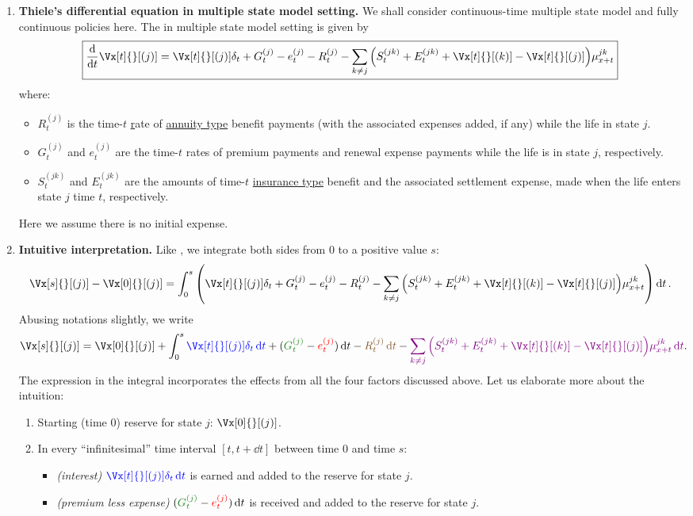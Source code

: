 \begin{enumerate}
\item\label{it:thiele-diff-eq-mult-state} \textbf{Thiele's differential
equation in multiple state model setting.} We shall consider continuous-time
multiple state model and fully continuous policies here. The  in multiple state model setting is given by
\[
\boxed{\dv{}{t}\Vx[t]{}[(j)]=\Vx[t]{}[(j)]\delta_t+G_t^{(j)}-e_{t}^{(j)}-R_t^{(j)}
-\sum_{k\ne j}^{}\qty(S_{t}^{(jk)}+E_{t}^{(jk)}+\Vx[t]{}[(k)]-\Vx[t]{}[(j)])\mu_{x+t}^{jk}}
\]
where:
\begin{itemize}
\item \(R_t^{(j)}\) is the time-\(t\) \underline{r}ate of \underline{annuity type}
benefit payments (with the associated expenses added, if any) while the life in
state \(j\).
\item \(G_t^{(j)}\) and \(e_t^{(j)}\) are the time-\(t\) rates of premium
payments and renewal expense payments while the life is in state \(j\), respectively.
\item \(S_t^{(jk)}\) and \(E_t^{(jk)}\) are the amounts of time-\(t\)
\underline{insurance type} benefit and the associated settlement expense, made
when the life enters state \(j\)  time \(t\), respectively.
\end{itemize}
\begin{note}
Here we assume there is no initial expense.
\end{note}

\item \textbf{Intuitive interpretation.}
Like , we integrate both sides from \(0\)
to a positive value \(s\):
\[
\Vx[s]{}[(j)]-\Vx[0]{}[(j)]=
\int_{0}^{s}\qty(\Vx[t]{}[(j)]\delta_t+G_t^{(j)}-e_{t}^{(j)}-R_t^{(j)}
-\sum_{k\ne j}^{}\qty(S_{t}^{(jk)}+E_{t}^{(jk)}+\Vx[t]{}[(k)]-\Vx[t]{}[(j)])\mu_{x+t}^{jk})
\dd{t}.
\]
Abusing notations slightly, we write
\[
\Vx[s]{}[(j)]=\Vx[0]{}[(j)]+
\int_{0}^{s}\blc{\Vx[t]{}[(j)]\delta_t\dd{t}}
+(\gc{G_t^{(j)}}-\rc{e_{t}^{(j)}})\dd{t}
-\brc{R_t^{(j)}\dd{t}}
-\vc{\sum_{k\ne j}^{}\qty(S_{t}^{(jk)}+E_{t}^{(jk)}+\Vx[t]{}[(k)]-\Vx[t]{}[(j)])\mu_{x+t}^{jk}\dd{t}}
.
\]
The expression in the integral incorporates the effects from all the four
factors discussed above. Let us elaborate more about the intuition:
\begin{enumerate}[label={(\arabic*)}]
\item Starting (time 0) reserve for state \(j\): \(\Vx[0]{}[(j)]\).
\item In every ``infinitesimal'' time interval \([t,t+\dd{t}]\) between time
\(0\) and time \(s\):
\begin{itemize}
\item {} \emph{(interest)} \(\blc{\Vx[t]{}[(j)]\delta_t\dd{t}}\)
is earned and added to the reserve for state \(j\).
\item {} \emph{(premium less expense)}
\((\gc{G_t^{(j)}}-\rc{e_t^{(j)}})\dd{t}\) is received and added to the reserve
for state \(j\).


\end{itemize}
\end{enumerate}
\end{enumerate}
